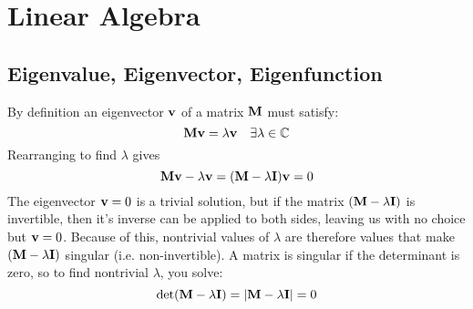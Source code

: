 \section{Linear Algebra}
\subsection{Eigenvalue, Eigenvector, Eigenfunction}
By definition an eigenvector $\vb{v}$ of a matrix $\vb{M}$ must satisfy: 
    \[\vb{M}\vb{v}=\lambda\vb{v}\quad\exists\lambda\in\mathbb{C}\]
    Rearranging to find $\lambda$ gives
    \begin{equation*}
        \vb{M}\vb{v}-\lambda\vb{v}=(\vb{M}-\lambda\vb{I})\vb{v}=0
    \end{equation*}
    The eigenvector $\vb{v}=0$ is a trivial solution, but if the matrix $(\vb{M}-\lambda\vb{I})$ is invertible, then it's inverse can be applied to both sides, leaving us with no choice but $\vb{v}=0$. Because of this, nontrivial values of $\lambda$ are therefore values that make $(\vb{M}-\lambda\vb{I})$ singular (i.e. non-invertible). 
    A matrix is singular if the determinant is zero, so to find nontrivial $\lambda$, you solve: 
    \begin{equation*}
        \det(\vb{M}-\lambda\vb{I})=\qty|\vb{M}-\lambda\vb{I}|=0
    \end{equation*}
%